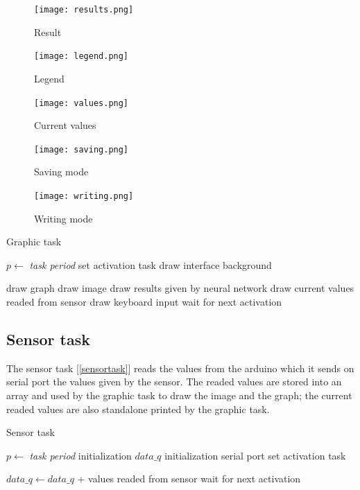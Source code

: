 \documentclass[12pt]{article}
\begin{document}
\begin{figure}[!t]
    \centering
    \texttt{[image: results.png]}
    \caption{Result}
    \label{results}
\end{figure}

\begin{figure}[!t]
    \centering
    \texttt{[image: legend.png]}
    \caption{Legend}
    \label{legend}
\end{figure}

\begin{figure}[!t]
    \centering
    \texttt{[image: values.png]}
    \caption{Current values}
    \label{values}
\end{figure}

\begin{figure}[!t]
    \centering
    \texttt{[image: saving.png]}
    \caption{Saving mode}
    \label{saving}
\end{figure}

\begin{figure}[!t]
    \centering
    \texttt{[image: writing.png]}
    \caption{Writing mode}
    \label{writing}
\end{figure}

\begin{algorithm}[t]
\caption{Graphic task}
\label{graphic}
\begin{algorithmic}
\State $p\gets$ \textit{task period}
\State set activation task
\State draw interface background

\Loop
\State draw graph
\State draw image
\State draw results given by neural network
\State draw current values readed from sensor
\State draw keyboard input
\State wait for next activation
\EndLoop

\end{algorithmic}
\end{algorithm}

\subsection{Sensor task}
The sensor task [\ref{sensortask}] reads the values from the arduino which it
sends on serial port the values given by the sensor. The readed values are
stored into an array and used by the graphic task to draw the image and the
graph; the current readed values are also standalone printed by the graphic
task.

\begin{algorithm}[t]
\caption{Sensor task}
\label{sensortask}

\begin{algorithmic}
\State $p\gets$ \textit{task period}
\State initialization $data\_q$
\State initialization serial port
\State set activation task

\Loop
\State $data\_q\gets data\_q$ + values readed from sensor
\State wait for next activation
\EndLoop

\end{algorithmic}
\end{algorithm}
\end{document}
